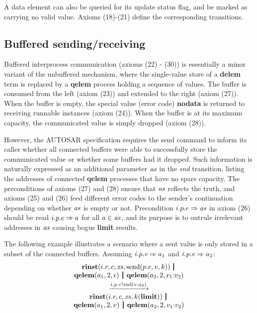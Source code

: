 \documentclass[twocolumn]{article}
\begin{document}
A data element can also be queried for its update status flag, and be marked as carrying no valid value. Axioms (18)-(21) define the corresponding transitions.


\subsection{Buffered sending/receiving}

Buffered interprocess communication (axioms (22) - (30)) is essentially a minor variant of the unbuffered mechanism, where the single-value store of a {\bf delem} term is replaced by a {\bf qelem} process holding a sequence of values. The buffer is consumed from the left (axiom (23)) and extended to the right (axiom (27)). When the buffer is empty, the special value (error code) {\bf nodata} is returned to receiving runnable instances (axiom (24)). When the buffer is at its maximum capacity, the communicated value is simply dropped (axiom (28)).

However, the AUTOSAR specification requires the send command to inform its caller whether all connected buffers were able to successfully store the communicated value or whether some buffers had it dropped. Such information is naturally expressed as an additional parameter $\Tvar{as}$ in the {\em snd} transition, listing the addresses of connected {\bf qelem} processes that have no spare capacity. The preconditions of axioms (27) and (28) ensure that $\Tvar{as}$ reflects the truth, and axioms (25) and (26) feed different error codes to the sender's continuation depending on whether $\Tvar{as}$ is empty or not. Precondition $\Tconnect {i.p.e} \Tvar{as}$ in axiom (26) should be read $\Tconnect {i.p.e} a$ for all $a \in \Tvar{as}$, and its purpose is to outrule irrelevant addresses in $\Tvar{as}$ causing bogus {\bf limit} results.

The following example illustrates a scenario where a sent value is only stored in a subset of the connected buffers. Assuming $\Tconnect {\Tep e p i} {a_1}$ and $\Tconnect {\Tep e p i} {a_2}$:
$$
\begin{array}{c}
	\Trinst {i.r} c \Xs {\TrteSend {p.e} v k} \,\Opar  \\
	{\Tqelem {a_1} 2 \Teps} \Opar {\Tqelem {a_2} 2 {\Tcons {v_1} {v_2}}} \vspace{0.6ex} \\
	\red{\say{i.p.e}{\Tsnd v {a_2}}} \\
	\Trinst {i.r} c \Xs {\Tap k \Tlimit} \,\Opar \\
	{\Tqelem {a_1} 2 v} \Opar {\Tqelem {a_2} 2 {\Tcons {v_1} {v_2}}}
\end{array}
$$
\end{document}
